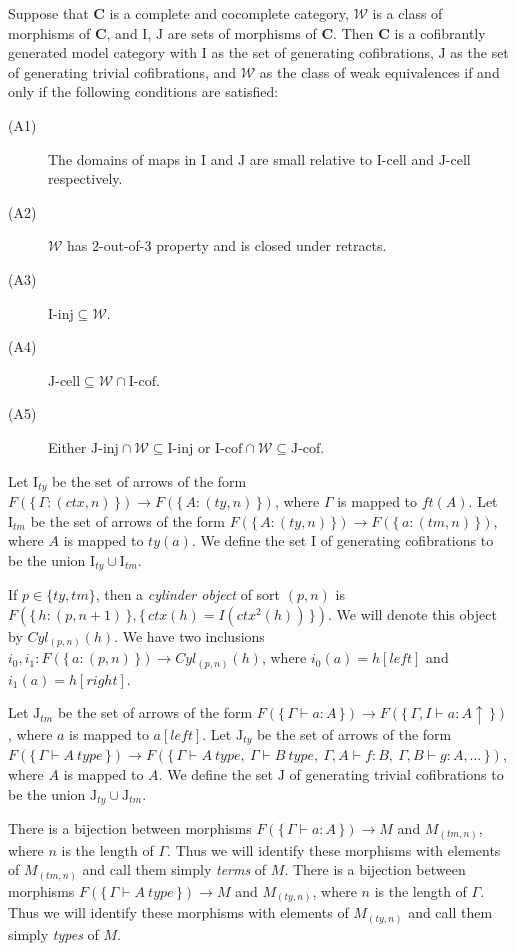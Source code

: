 \documentclass[reqno]{amsart}
\theoremstyle{definition}
\theoremstyle{remark}
\newcommand{\cat}[1]{\mathbf{#1}}
\newcommand{\C}{\cat{C}}
\newcommand{\we}{\mathcal{W}}
\newcommand{\I}{\mathrm{I}}
\newcommand{\J}{\mathrm{J}}
\newcommand{\class}[2]{#1\text{-}\mathrm{#2}}
\newcommand{\Iinj}[1][\I]{\class{#1}{inj}}
\newcommand{\Icell}[1][\I]{\class{#1}{cell}}
\newcommand{\Icof}[1][\I]{\class{#1}{cof}}
\newcommand{\Jinj}[1][]{\Iinj[\J#1]}
\newcommand{\Jcell}[1][]{\Icell[\J#1]}
\newcommand{\Jcof}[1][]{\Icof[\J#1]}
\numberwithin{figure}{section}
\begin{document}
\begin{prop}
Suppose that $\C$ is a complete and cocomplete category, $\we$ is a class of morphisms of $\C$, and $\I$, $\J$ are sets of morphisms of $\C$.
Then $\C$ is a cofibrantly generated model category with $\I$ as the set of generating cofibrations,
$\J$ as the set of generating trivial cofibrations, and $\we$ as the class of weak equivalences if and only if the following conditions are satisfied:
\begin{description}
\item[(A1)] The domains of maps in $\I$ and $\J$ are small relative to $\Icell$ and $\Jcell$ respectively.
\item[(A2)] $\we$ has 2-out-of-3 property and is closed under retracts.
\item[(A3)] $\Iinj \subseteq \we$.
\item[(A4)] $\Jcell \subseteq \we \cap \Icof$.
\item[(A5)] Either $\Jinj \cap \we \subseteq \Iinj$ or $\Icof \cap \we \subseteq \Jcof$.
\end{description}
\end{prop}

Let $\I_{ty}$ be the set of arrows of the form $F(\{\,\Gamma : (ctx,n)\,\}) \to F(\{\,A : (ty,n)\,\})$, where $\Gamma$ is mapped to $ft(A)$.
Let $\I_{tm}$ be the set of arrows of the form $F(\{\,A : (ty,n)\,\}) \to F(\{\,a : (tm,n)\,\})$, where $A$ is mapped to $ty(a)$.
We define the set $\I$ of generating cofibrations to be the union $\I_{ty} \cup \I_{tm}$.

If $p \in \{ ty, tm\}$, then a \emph{cylinder object} of sort $(p,n)$ is $F(\{\,h : (p,n+1)\,\}, \{\,ctx(h) = I(ctx^2(h))\,\})$.
We will denote this object by $Cyl_{(p,n)}(h)$.
We have two inclusions $i_0, i_1 : F(\{\,a : (p,n)\,\}) \to Cyl_{(p,n)}(h)$, where $i_0(a) = h[left]$ and $i_1(a) = h[right]$.

Let $\J_{tm}$ be the set of arrows of the form $F(\{\,\Gamma \vdash a : A\,\}) \to F(\{\,\Gamma, I \vdash a : A\!\uparrow\,\})$, where $a$ is mapped to $a[left]$.
Let $\J_{ty}$ be the set of arrows of the form $F(\{\,\Gamma \vdash A\ type\,\}) \to F(\{\,\Gamma \vdash A\ type,\ \Gamma \vdash B\ type,\ \Gamma, A \vdash f : B,\ \Gamma, B \vdash g : A, \ldots \,\})$, where $A$ is mapped to $A$.
We define the set $\J$ of generating trivial cofibrations to be the union $\J_{ty} \cup \J_{tm}$.

There is a bijection between morphisms $F(\{\,\Gamma \vdash a : A\,\}) \to M$ and $M_{(tm,n)}$, where $n$ is the length of $\Gamma$.
Thus we will identify these morphisms with elements of $M_{(tm,n)}$ and call them simply \emph{terms} of $M$.
There is a bijection between morphisms $F(\{\,\Gamma \vdash A\ type\,\}) \to M$ and $M_{(ty,n)}$, where $n$ is the length of $\Gamma$.
Thus we will identify these morphisms with elements of $M_{(ty,n)}$ and call them simply \emph{types} of $M$.
\end{document}

